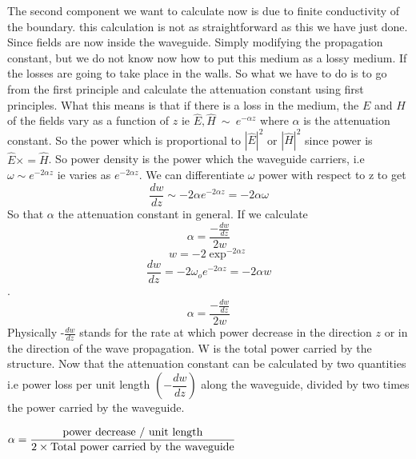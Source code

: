 	The second component we want to calculate now is due to finite conductivity of the boundary. this calculation is not as straightforward as this we have just done. Since fields are now inside the waveguide. Simply modifying the propagation constant, but we do not know now how to put this medium as a lossy medium. If the losses are going to take place in the walls. So what we have to do is to go from the first principle and calculate the attenuation constant using first principles. What this means is that if there is a loss in the medium, the $E$ and $H$ of the fields vary as a function of $z$ ie $ {\hat{E}}, {\hat{H}} \ \sim\ e^{-\alpha z}$ where $\alpha$ is the attenuation constant. So the power which is proportional to $|{\hat{E}}|^{2}$ or $|{\hat{H}}|^{2}$ since power is ${\hat{E}}\times={\hat{H}}$. So power density is the power which the waveguide carriers, i.e $\omega\sim e^{-2\alpha z}$ ie varies as $e^{-2\alpha z}$. We can differentiate $\omega$ power with respect to z to get $$\dfrac{dw}{dz}\sim-2\alpha e^{-2\alpha z} = -2\alpha\omega$$ So that $\alpha$ the attenuation constant in general. If we calculate $$\alpha = \dfrac{-\frac{dw}{dz}}{2w}$$ $$w = -2\exp^{-2\alpha z}$$ $$\frac{dw}{dz} = -2\omega_{o} e^{-2\alpha z} = -2\alpha w$$. $$\alpha = \dfrac{-\frac{dw}{dz}}{2w}$$ Physically -$\frac{dw}{dz}$ stands for the rate at which power decrease in the direction $z$ or in the direction of the wave propagation. W is the total power carried by the structure. Now that the attenuation constant can be calculated by two quantities i.e power loss per unit length $(-\dfrac{dw}{dz})$  along the waveguide, divided by two times the power carried by the waveguide.
	
	$\alpha = \dfrac{\textnormal{power decrease / unit length}}{2\times \textnormal{Total power carried by the waveguide}}$
